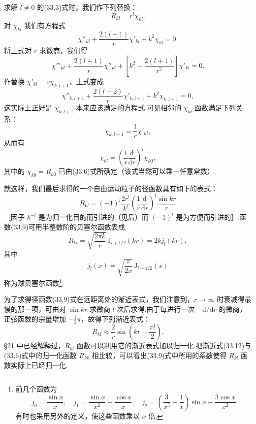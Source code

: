 求解 $l\neq0$ 的(33.3)式时，我们作下列替换：
\begin{equation}
  R_{kl}=r^l\chi_{kl}.
\end{equation}
对 $\chi_{kl}$ 我们有方程式
\begin{equation*}
  \chi''_{kl}+\frac{2(l+1)}{r}\chi'_{kl}+k^2\chi_{kl}=0.
\end{equation*}
将上式对 $r$ 求微商，我们得
\begin{equation*}
  \chi'''_{kl}+\frac{2(l+1)}{r}\chi''_{kl}
  +\left[k^2-\frac{2(l+1)}{r^2}\right]\chi'_{kl}=0.
\end{equation*}
作替换 $\chi'_{kl}=r\chi_{k,l+1}$，上式变成
\begin{equation*}
  \chi''_{k,l+1}+\frac{2(l+2)}{r}\chi'_{k,l+1}+k^2\chi_{k,l+1}=0,
\end{equation*}
这实际上正好是 $\chi_{k,l+1}$ 本来应该满足的方程式.可见相邻的 $\chi_{kl}$ 函数满足下列关系：
\begin{equation}
  \chi_{k,l+1}=\frac{1}{r}\chi'_{kl},
\end{equation}
从而有
\begin{equation*}
  \chi_{kl}=\left(\frac{1}{r}\frac{\mathrm{d}}{\mathrm{d}r}\right)^l\chi_{k0},
\end{equation*}
其中的 $\chi_{k0}=R_{k0}$ 已由(33.6)式所确定（该式当然可以乘一任意常数）.

就这样，我们最后求得的一个自由运动粒子的径函数具有如下的表式：
\begin{equation}
  R_{kl}=(-1)^l\frac{2r^l}{k^l}\left(\frac{1}{r}\frac{\mathrm{d}}{\mathrm{d}r}\right)^l\frac{\sin kr}{r}
\end{equation}
［因子 $k^{-l}$ 是为归一化目的而引进的（见后）而 $(-1)^l$ 是为方便而引进的］.函数(33.9)可用半整数阶的贝塞尔函数表成
\begin{equation}
  R_{kl}=\sqrt{\frac{2\pi k}{r}}\,\mathrm{J}_{l+1/2}(kr)=2kj_l(kr),
\end{equation}
其中
\begin{equation}
  j_l(x)=\sqrt{\frac{\pi}{2x}}\,\mathrm{J}_{l+1/2}(x)
\end{equation}
称为球贝塞尔函数\footnote{前几个函数为
\begin{equation*}
  j_0=\frac{\sin x}{x},\quad
  j_1=\frac{\sin x}{x^2}-\frac{\cos x}{x},\quad
  j_2=\left(\frac{3}{x^3}-\frac{1}{x}\right)\sin x-\frac{3\cos x}{x^2}
\end{equation*}
有时也采用另外的定义，使这些函数乘以 $x$ 倍.}.

为了求得径函数(33.9)式在远距离处的渐近表式，我们注意到，$r\to\infty$ 时衰减得最慢的那一项，可由对 $\sin kr$ 求微商 $l$ 次后求得.由于每进行一次 $-\mathrm{d}/\mathrm{d}r$ 的微商，正弦函数的宗量增加 $-\frac{1}{2}\pi$，故得下列渐近表式：
\begin{equation}
  R_{kl}\approx\frac{2}{r}\sin\left(kr-\frac{\pi l}{2}\right).
\end{equation}
§21 中已经解释过，$R_{kl}$ 函数可以利用它的渐近表式加以归一化.把渐近式(33.12)与(33.6)式中的归一化函数 $R_{k0}$ 相比较，可以看出(33.9)式中所用的系数使得 $R_{kl}$ 函数实际上已经归一化.


